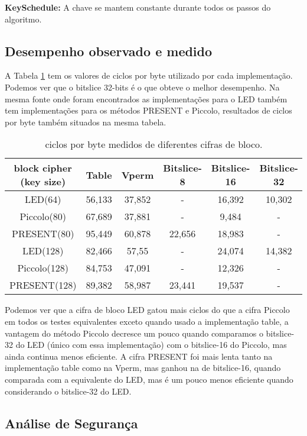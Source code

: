 \documentclass[runningheads,a4paper,11pt]{llncs}
\begin{document}
\noindent\textbf{KeySchedule:} A chave se mantem constante durante todos os passos do algoritmo.

\subsection{Desempenho observado e medido}
A Tabela  \ref{tabela:referencia_resultados} tem os valores de ciclos por byte utilizado por cada implementa\c{c}\~ao. Podemos ver que o bitslice 32-bits \'e o que obteve o melhor desempenho. Na mesma fonte onde foram encontrados as implementa\c{c}\~oes para o LED tamb\'em tem implementa\c{c}\~oes para os m\'etodos PRESENT e Piccolo, resultados de ciclos por byte tamb\'em situados na mesma tabela.

\begin{table}[htbp]
	\centering
	\caption{ciclos por byte medidos de diferentes cifras de bloco.}
	\begin{tabular}{|c|c|c|c|c|c|}
		\hline
		block cipher (key size) & Table & Vperm & Bitslice-8 & Bitslice-16 & Bitslice-32 \\ \hline
		LED(64) & 56,133 & 37,852 & - & 16,392 & 10,302 \\ \hline
		Piccolo(80) & 67,689 & 37,881 & - & 9,484 & - \\ \hline
		PRESENT(80) & 95,449 & 60,878 & 22,656 & 18,983 & - \\ \hline
		LED(128) & 82,466 & 57,55 & - & 24,074 & 14,382 \\ \hline
		Piccolo(128) & 84,753 & 47,091 & - & 12,326 & - \\ \hline
		PRESENT(128) & 89,382 & 58,987 & 23,441 & 19,537 & - \\ \hline
	\end{tabular}
	\label{tabela:referencia_resultados}
\end{table}

Podemos ver que a cifra de bloco LED gatou mais ciclos do que a cifra Piccolo em todos os testes equivalentes exceto quando usado a implementa\c{c}\~ao table, a vantagem do m\'etodo Piccolo decresce um pouco quando comparamos o bitslice-32 do LED (\'unico com essa implementa\c{c}\~ao) com o bitslice-16 do Piccolo, mas ainda continua menos eficiente. A cifra PRESENT foi mais lenta tanto na implementa\c{c}\~ao table como na Vperm, mas ganhou na de bitslice-16, quando comparada com a equivalente do LED, mas \'e um pouco menos eficiente quando considerando o bitslice-32 do LED.

\subsection{An\'alise de Seguran\c{c}a}
\end{document}
